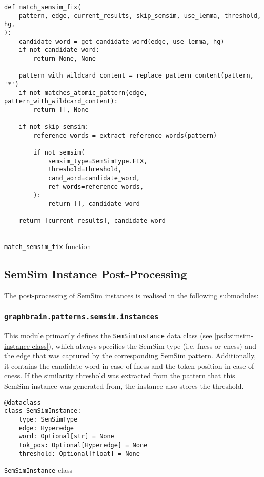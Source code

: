 \documentclass[11pt, numbers=noenddot]{scrreprt}
\begin{document}
\begin{pseudo}
\begin{lstlisting}
def match_semsim_fix(
    pattern, edge, current_results, skip_semsim, use_lemma, threshold, hg,
):
    candidate_word = get_candidate_word(edge, use_lemma, hg)
    if not candidate_word:
        return None, None

    pattern_with_wildcard_content = replace_pattern_content(pattern, '*')
    if not matches_atomic_pattern(edge, pattern_with_wildcard_content):
        return [], None

    if not skip_semsim:
        reference_words = extract_reference_words(pattern)

        if not semsim(
            semsim_type=SemSimType.FIX,
            threshold=threshold,
            cand_word=candidate_word,
            ref_words=reference_words,
        ):
            return [], candidate_word

    return [current_results], candidate_word
 
\end{lstlisting}
\caption{\texttt{match\_semsim\_fix} function}
\label{psd:match-semsim-fix-function}
\end{pseudo}

\subsection{SemSim Instance Post-Processing}
The post-processing of SemSim instances is realised in the following submodules:

\subsubsection{\texttt{graphbrain.patterns.semsim.instances}}

This module primarily defines the \texttt{SemSimInstance} data class (see \cref{psd:simsim-instance-class}), which always specifies the SemSim type (i.e. \gls{fness} or \gls{cness}) and the edge that was captured by the corresponding SemSim pattern. Additionally, it contains the candidate word in case of \gls{fness} and the token position in case of \gls{cness}. If the similarity threshold was extracted from the pattern that this SemSim instance was generated from, the instance also stores the threshold.

\begin{pseudo}
\begin{lstlisting}
@dataclass
class SemSimInstance:
    type: SemSimType
    edge: Hyperedge
    word: Optional[str] = None
    tok_pos: Optional[Hyperedge] = None
    threshold: Optional[float] = None
\end{lstlisting}
\caption{\texttt{SemSimInstance} class}
\label{psd:simsim-instance-class}
\end{pseudo}
\end{document}
